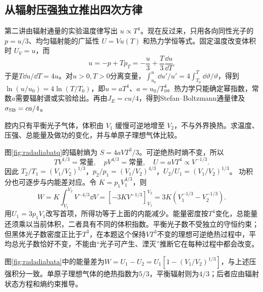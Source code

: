 \subsection{从辐射压强独立推出四次方律}
\label{th:photonlaw}
第二讲由辐射通量的实验温度律写出 $u\propto T^4$。现在反过来，只用各向同性光子的 $p=u/3$、均匀辐射能的广延性 $U=Vu(T)$ 和热力学恒等式。固定温度改变体积时 $U_V=u$，而
\[
 u=-p+Tp_T=-\frac u3+\frac T3\frac{\dd u}{\dd T}.
\]
于是$T\dd u/\dd T=4u$。对$u>0,T>0$分离变量，$\int_{u_0}^{u}\dd u'/u'=4\int_{T_0}^{T}\dd\vartheta/\vartheta$，得到$\ln(u/u_0)=4\ln(T/T_0)$，即$u=aT^4$、$a=u_0/T_0^4$。热力学只能确定幂指数，常数$a$需要辐射谱或实验给出。再由$J_E=cu/4$，得到Stefan--Boltzmann通量律及$\sigma_{\rm SB}=ca/4$。

\begin{example}[辐射腔的可逆绝热关系]\label{ex:radiationadiabat}
腔内只有平衡光子气体，体积由 $V_1$ 缓慢可逆地增至 $V_2$，不与外界换热。求温度、压强、总能量及做功的变化，并与单原子理想气体比较。
\end{example}
\begin{solution}
图\ref{fig:radadiabatq}的辐射熵为 $S=4aVT^3/3$。可逆绝热时熵不变，所以
\[
 TV^{1/3}=\text{常量},\quad pV^{4/3}=\text{常量},\quad
 U=aVT^4\propto V^{-1/3}.
\]
因此 $T_2/T_1=(V_1/V_2)^{1/3}$，$p_2/p_1=(V_1/V_2)^{4/3}$，$U_2/U_1=(V_1/V_2)^{1/3}$。
功积分也可逐步与内能差对应。令 $K=p_1V_1^{4/3}$，则
\[
 W=K\int_{V_1}^{V_2}V^{-4/3}\dd V
 =[-3KV^{-1/3}]_{V_1}^{V_2}
 =3K(V_1^{-1/3}-V_2^{-1/3}).
\]
用$U_1=3p_1V_1$改写首项，所得功等于上面的内能减少。能量密度按$T^4$变化，总能量还须乘以当前体积，二者具有不同的体积指数。平衡光子数不受独立的守恒约束；但黑体光子数密度正比于$T^3$，在本题这个保持$VT^3$不变的理想可逆绝热过程中，平均总光子数恰好不变，不能由“光子可产生、湮灭”推断它在每种过程中都会改变。

图\ref{fig:radadiabata}中的能量差为$W=U_1-U_2=U_1[1-(V_1/V_2)^{1/3}]$，与上述压强积分一致。单原子理想气体的绝热指数为$5/3$，平衡辐射则为$4/3$；后者应由辐射状态方程和熵约束推导。
\end{solution}

